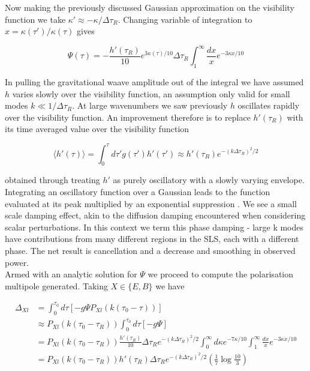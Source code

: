 \documentclass[a4paper,10pt]{article}
\begin{document}
Now making the previously discussed Gaussian approximation on the visibility function we take $\kappa'\approx -\kappa/\Delta\tau_R$. Changing variable of integration to $x=\kappa(\tau')/\kappa(\tau)$ gives

\begin{equation}
\Psi(\tau) = -\frac{h'(\tau_R)}{10}e^{3\kappa(\tau)/10}\Delta\tau_R\int_1^\infty\frac{dx}{x}e^{-3\kappa x/10}
\end{equation}

In pulling the gravitational waave amplitude out of the integral we have assumed $h$ varies slowly over the visibility function, an assumption only valid for small modes $k\ll 1/\Delta\tau_R$. At large wavenumbers we saw previously $h$ oscillates rapidly over the visibility function. An improvement therefore is to replace $h'(\tau_R)$ with its time averaged value over the visibility function

\begin{equation}
\langle h'(\tau) \rangle = \int_0^{\tau} d\tau' g(\tau')h'(\tau') \approx h'(\tau_R)e^{-(k\Delta\tau_R)^2/2}
\end{equation}

obtained through treating $h'$ as purely oscillatory with a slowly varying envelope. Integrating an oscillatory function over a Gaussian leads to the function evaluated at its peak multiplied by an exponential suppression . We see a small scale damping effect, akin to the diffusion damping encountered when considering scalar perturbations. In this context we term this phase damping - large k modes have contributions from many different regions in the SLS, each with a different phase. The net result is cancellation and a decrease and smoothing in observed power.\\

Armed with an analytic solution for $\Psi$ we proceed to compute the polarisation multipole generated. Taking $X\in\{E,B\}$ we have

\begin{equation}
\begin{split}
\Delta_{Xl} &= \int_0^{\tau_0} d\tau [-g\Psi P_{Xl}(k(\tau_0-\tau))]\\
&\approx P_{Xl}(k(\tau_0-\tau_R)) \int_0^{\tau_0} d\tau [-g\Psi] \\
&= P_{Xl}(k(\tau_0-\tau_R)) \frac{h'(\tau_R)}{10}\Delta\tau_Re^{-(k\Delta\tau_R)^2/2} \int_0^\infty d\kappa e^{-7\kappa/10} \int_1^\infty\frac{dx}{x}e^{-3\kappa x/10}\\
&=P_{Xl}(k(\tau_0-\tau_R)) h'(\tau_R)\Delta\tau_Re^{-(k\Delta\tau_R)^2/2} (\frac{1}{7}\log{\frac{10}{3}})
\end{split}
\end{equation}
\end{document}
